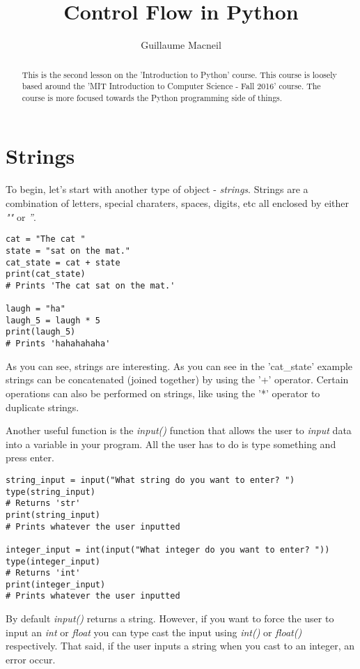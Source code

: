\documentclass{article}
\title{Control Flow in Python}
\author{Guillaume Macneil}
\begin{document}
\maketitle

\begin{abstract}
This is the second lesson on the 'Introduction to Python' course. This course is loosely based around the 'MIT Introduction to Computer Science - Fall 2016' course. The course is more focused towards the Python programming side of things.
\end{abstract}

\section{Strings}

To begin, let's start with another type of object - \textit{strings}. Strings are a combination of letters, special charaters, spaces, digits, etc all enclosed by either \textit{""} or \textit{''}.

\begin{verbatim}
cat = "The cat "
state = "sat on the mat."
cat_state = cat + state
print(cat_state)
# Prints 'The cat sat on the mat.'

laugh = "ha"
laugh_5 = laugh * 5
print(laugh_5)
# Prints 'hahahahaha'
\end{verbatim}

As you can see, strings are interesting. As you can see in the 'cat\_state' example strings can be concatenated (joined together) by using the '+' operator. Certain operations can also be performed on strings, like using the '*' operator to duplicate strings. \medskip

Another useful function is the \textit{input()} function that allows the user to \textit{input} data into a variable in your program. All the user has to do is type something and press enter.

\newpage

\begin{verbatim}
string_input = input("What string do you want to enter? ")
type(string_input)
# Returns 'str'
print(string_input)
# Prints whatever the user inputted

integer_input = int(input("What integer do you want to enter? "))
type(integer_input)
# Returns 'int'
print(integer_input)
# Prints whatever the user inputted
\end{verbatim}

By default \textit{input()} returns a string. However, if you want to force the user to input an \textit{int} or \textit{float} you can type cast the input using \textit{int()} or \textit{float()} respectively. That said, if the user inputs a string when you cast to an integer, an error occur. \medskip
\end{document}

